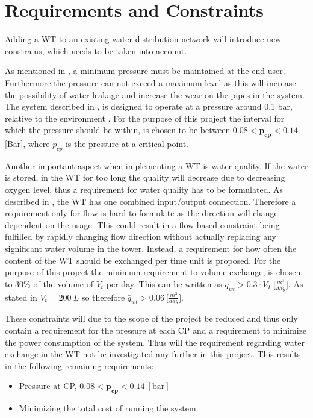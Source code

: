 \chapter{Requirements and Constraints}
\label{Requirements_and_constraints}

Adding a WT to an existing water distribution network will introduce new constrains, which needs to be taken into account. 

As mentioned in , a minimum pressure must be maintained at the end user. Furthermore the pressure can not exceed a maximum level as this will increase the possibility of water leakage and increase the wear on the pipes in the system. The system described in , is designed to operate at a pressure around 0.1 bar, relative to the environment \cite{master_aau}. For the purpose of this project the interval for which the pressure should be within, is chosen to be between $0.08 < \pmb{p_{cp}} < 0.14$ [Bar], where $p_{cp}$ is the pressure at a critical point.

Another important aspect when implementing a WT is water quality. If the water is stored, in the WT for too long the quality will decrease due to decreasing oxygen level, thus a requirement for water quality has to be formulated. As described in , the WT has one combined input/output connection. Therefore a requirement only for flow is hard to formulate as the direction will change dependent on the usage. This could result in a flow based constraint being fulfilled by rapidly changing flow direction without actually replacing any significant water volume in the tower. Instead, a requirement for how often the content of the WT should be exchanged per time unit is proposed. For the purpose of this project the minimum requirement to volume exchange, is chosen to 30\% of the volume of $V_t$ per day. This can be written as $\bar{q}_{wt} > 0.3\cdot V_T \: \big[\frac{m^3}{day}\big]$. As stated in  $V_t = 200 \:L$ so therefore $\bar{q}_{wt} > 0.06 \: \big[\frac{m^3}{day}\big]$.

These constraints will due to the scope of the project be reduced and thus only contain a requirement for the pressure at each CP and a requirement to minimize the power consumption of the system. Thus will the requirement regarding water exchange in the WT not be investigated any further in this project. 
This results in the following remaining requirements:

\begin{itemize}
	\item Pressure at CP, $0.08 < \pmb{p_{cp}} < 0.14 \:[\text{bar}]$
%
	\item Minimizing the total cost of running the system
\end{itemize}
 